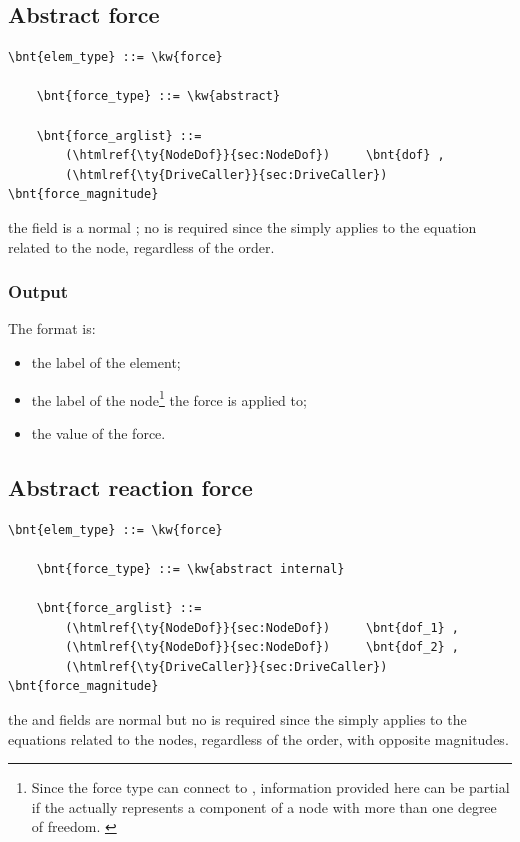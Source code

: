 \subsection{Abstract force}\label{sec:EL:FORCE:ABSTRACT}
\begin{Verbatim}[commandchars=\\\{\}]
    \bnt{elem_type} ::= \kw{force}

    \bnt{force_type} ::= \kw{abstract}

    \bnt{force_arglist} ::=
        (\htmlref{\ty{NodeDof}}{sec:NodeDof})     \bnt{dof} ,
        (\htmlref{\ty{DriveCaller}}{sec:DriveCaller}) \bnt{force_magnitude}
\end{Verbatim}
the  field is a normal ; no  is required
since the  simply applies to the equation related to the node,
regardless of the order.

\subsubsection{Output}
The format is:
\begin{itemize}
    \item the label of the element;
    \item the label of the node\footnote{Since the  force type
	can connect to , information provided here
	can be partial if the  actually represents
	a component of a node with more than one degree of freedom.
	\label{footnote:EL:FORCE:ABSTRACT:OUTPUT:node_dof}}
	the force is applied to;
    \item the value of the force.
\end{itemize}

\subsection{Abstract reaction force}
\begin{Verbatim}[commandchars=\\\{\}]
    \bnt{elem_type} ::= \kw{force}

    \bnt{force_type} ::= \kw{abstract internal}

    \bnt{force_arglist} ::=
        (\htmlref{\ty{NodeDof}}{sec:NodeDof})     \bnt{dof_1} ,
        (\htmlref{\ty{NodeDof}}{sec:NodeDof})     \bnt{dof_2} ,
        (\htmlref{\ty{DriveCaller}}{sec:DriveCaller}) \bnt{force_magnitude}
\end{Verbatim}
the  and  fields are normal 
but no  is required since the  simply applies
to the equations related to the nodes, regardless of the order, with
opposite magnitudes.

